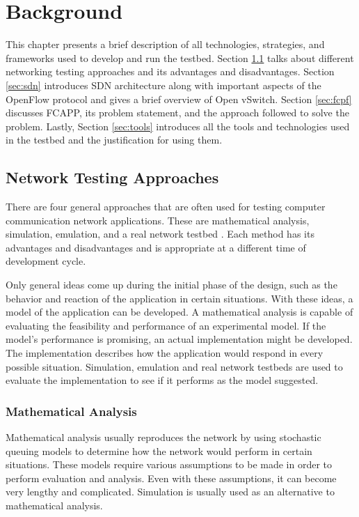 \newpage
\thispagestyle{empty}
\mbox{}


\chapter{Background}\label{BACK-CHAP}
This chapter presents a brief description of all technologies, strategies, and frameworks used to develop and run the testbed. Section \ref{sec:nta} talks about different networking testing approaches and its advantages and disadvantages. Section \ref{sec:sdn} introduces SDN architecture along with important aspects of the OpenFlow protocol and gives a brief overview of Open vSwitch. Section \ref{sec:fcpf} discusses FCAPP, its problem statement, and the approach followed to solve the problem. Lastly, Section \ref{sec:tools} introduces all the tools and technologies used in the testbed and the justification for using them.

\section{Network Testing Approaches}\label{sec:nta}
There are four general approaches that are often used for testing computer communication network applications. These are mathematical analysis, simulation, emulation, and a real network testbed \cite{doi:10.1287/opre.50.1.125.17772} \cite{Krop:2007:JCS:1287767.1287774}. Each method has its advantages and disadvantages and is appropriate at a different time of development cycle. 

Only general ideas come up during the initial phase of the design, such as the behavior and reaction of the application in certain situations. With these ideas, a model of the application can be developed. A mathematical analysis is capable of evaluating the feasibility and performance of an experimental model. If the model's performance is promising, an actual implementation might be developed. The implementation describes how the application would respond in every possible situation. Simulation, emulation and real network testbeds are used to evaluate the implementation to see if it performs as the model suggested.

\subsection{Mathematical Analysis}
Mathematical analysis usually reproduces the network by using stochastic queuing models \cite{2013arXiv1307.2968Z} to determine how the network would perform in certain situations. These models require various assumptions to be made in order to perform evaluation and analysis. Even with these assumptions, it can become very lengthy and complicated. Simulation is usually used as an alternative to mathematical analysis.

